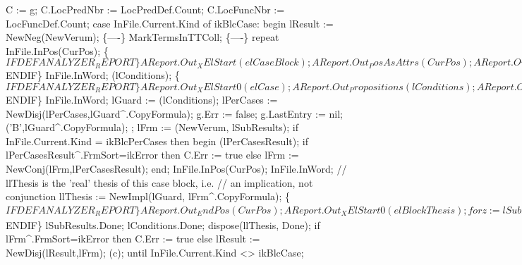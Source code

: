    C := g;
   C.LocPredNbr := LocPredDef.Count;
   C.LocFuncNbr := LocFuncDef.Count;
   case InFile.Current.Kind of
      ikBlcCase:
         begin lResult := NewNeg(NewVerum);
         \{----\}
         MarkTermsInTTColl;
         \{----\}
         repeat InFile.InPos(CurPos);
         \{$IFDEF ANALYZER_REPORT\}
         AReport.Out_XElStart(elCaseBlock);
         AReport.Out_PosAsAttrs(CurPos);
         AReport.Out_XAttrEnd;
         \{$ENDIF\}
         InFile.InWord;
         (lConditions);
         \{$IFDEF ANALYZER_REPORT\}
         AReport.Out_XElStart0(elCase);
         AReport.Out_Propositions(lConditions);
         AReport.Out_XElEnd(elCase);
         \{$ENDIF\}
         InFile.InWord;
         lGuard := (lConditions);
         lPerCases := NewDisj(lPerCases,lGuard^.CopyFormula);
         g.Err := false; g.LastEntry := nil;
         ('B',lGuard^.CopyFormula);
         ;
         lFrm := (NewVerum, lSubResults);
         if InFile.Current.Kind = ikBlcPerCases then
         begin
            (lPerCasesResult);
            if lPerCasesResult^.FrmSort=ikError then C.Err := true
            else lFrm := NewConj(lFrm,lPerCasesResult);
         end;
         InFile.InPos(CurPos); InFile.InWord;
         // llThesis is the 'real' thesis of this case block, i.e.
         // an implication, not conjunction
         llThesis := NewImpl(lGuard, lFrm^.CopyFormula);
         \{$IFDEF ANALYZER_REPORT\}
         AReport.Out_EndPos(CurPos);
         AReport.Out_XElStart0(elBlockThesis);
         for z := lSubResults.Count-1 downto 0 do
         begin
            AReport.Out_XElStart0(elThesis);
            AReport.Out_Formula(lSubResults.Items^[z]);
            AReport.Out_NatFunc(elThesisExpansions, EmptyNatFunc);
            AReport.Out_XElEnd(elThesis);
         end;
         AReport.Out_Formula(llThesis);
         // just as Thesis now, stdprep has to produce a proposition
         AReport.Out_XElEnd(elBlockThesis);
         AReport.Out_XElEnd(elCaseBlock);
         \{$ENDIF\}
         lSubResults.Done;
         lConditions.Done;
         dispose(llThesis, Done);
         if lFrm^.FrmSort=ikError then C.Err := true
         else lResult := NewDisj(lResult,lFrm);
         (c);
         until InFile.Current.Kind <> ikBlcCase;
